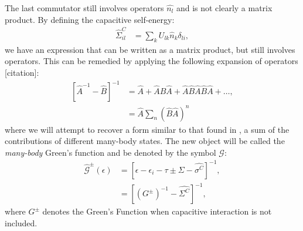 \documentclass{article}
\newcommand{\red}[1]{ {\color{red} #1}}
\begin{document}
\begin{multicols}{2}
        The last commutator still involves operators $\hat{n_l}$ and is not clearly a matrix product. By defining the capacitive self-energy: 
        \begin{align*}
        \hat{\Sigma}^C_{il} &= \sum_k U_{lk} \hat{n}_k \delta_{li},
        \end{align*}
        we have an expression that can be written as a matrix product, but still involves operators. This can be remedied by applying the following expansion of operators\red{[citation]}:
        \begin{align}
        \left[ \hat{A}^{-1} - \hat{B}\right]^{-1} &=\hat{A} + \hat{A}\hat{B}\hat{A} + \hat{A}\hat{B}\hat{A}\hat{B}\hat{A} + \ldots,
         \nonumber\\
        &= \hat{A} \sum_n \left(\hat{B}\hat{A}\right)^n\label{eq:expansion}
        \end{align} 
        where we will attempt to recover a form similar to that found in \citet{haugjauho}, a sum of the contributions of different many-body states. The new object will be called the \emph{many-body} Green's function and be denoted by the symbol $\mathscr{G}$:
        \begin{align}
            \mathscr{\hat{G}}^\pm(\epsilon) &= \left[ \epsilon - \epsilon_i - \tau \pm \Sigma - \hat{\sigma^C}\right]^{-1}, \\
            &= \left[ \left(G^\pm\right)^{-1}- \hat{\Sigma^C}\right]^{-1} ,\nonumber
        \end{align}
        where $G^\pm$ denotes the Green's Function when capacitive interaction is not included. 
        

\end{multicols}
\end{document}
